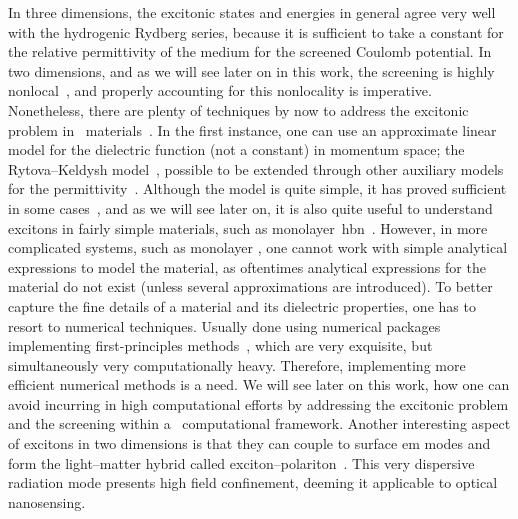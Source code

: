 In three dimensions, the excitonic states and energies in general agree very well with the hydrogenic Rydberg series, because it is sufficient to take a constant for the relative permittivity of the medium for the screened Coulomb potential.
In two dimensions, and as we will see later on in this work, the screening is highly nonlocal~\cite{Thygesen_2017,Cudazzo_2011}, and properly accounting for this nonlocality is imperative.
Nonetheless, there are plenty of techniques by now to address the excitonic problem in \bd~materials~\cite{Mauricio_2022}.
In the first instance, one can use an approximate linear model for the dielectric function (not a constant) in momentum space; the Rytova--Keldysh model~\cite{Mauricio_2022,Cudazzo_2011}, possible to be extended through other auxiliary models for the permittivity~\cite{Trolle_Pedersen_Veniard_2017}.
Although the model is quite simple, it has proved sufficient in some cases~\cite{Mauricio_2022,Ventura_2019,Gomes_Trallero-Giner_Vasilevskiy_2021}, and as we will see later on, it is also quite useful to understand excitons in fairly simple materials, such as monolayer~\gls{hbn}~\cite{Ferreira_2019,Ventura_2019}.
However, in more complicated systems, such as monolayer , one cannot work with simple analytical expressions to model the material, as oftentimes analytical expressions for the material do not exist (unless several approximations are introduced).
To better capture the fine details of a material and its dielectric properties, one has to resort to numerical techniques.
Usually done using numerical packages implementing first-principles methods~\cite{BerkeleyGW,GPAW_2025,Yambo_2009,Siesta_2020,Abinit_2016,Prandini_Galante_Marzari_Umari_2019}, which are very exquisite, but simultaneously very computationally heavy.
Therefore, implementing more efficient numerical methods is a need.
We will see later on this work, how one can avoid incurring in high computational efforts by addressing the excitonic problem and the screening within a \bd~computational framework.
Another interesting aspect of excitons in two dimensions is that they can couple to surface \gls{em} modes and form the light--matter hybrid called exciton--polariton~\cite{Flatten_He_Coles_Trichet_Powell_Taylor_Warner_Smith_2016,Fang_Yao_Wang_2023}.
This very dispersive radiation mode presents high field confinement, deeming it applicable to optical nanosensing.

